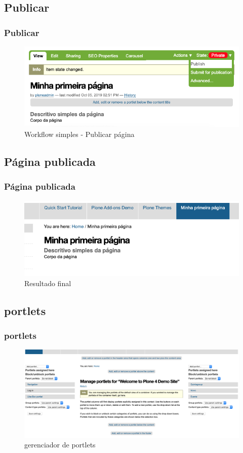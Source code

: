\documentclass{beamer}
\begin{document}
\subsection{Publicar}
\begin{frame}
    \frametitle{Publicar}
    \begin{figure}
        \includegraphics[width=.7\textwidth]{./img/001-004_-_publicar_pagina.png}
        \caption{Workflow simples - Publicar página}
    \end{figure}
\end{frame}

\subsection{Página publicada}
\begin{frame}
    \frametitle{Página publicada}
    \begin{figure}
        \includegraphics[width=.7\textwidth]{./img/001-005_-_pagina_publicada.png}
        \caption{Resultado final}
    \end{figure}
\end{frame}

\subsection{portlets}
\begin{frame}
    \frametitle{portlets}
    \begin{figure}
        \includegraphics[width=.7\textwidth]{./img/001-006_-_portlets.png}
        \caption{gerenciador de portlets}
    \end{figure}
\end{frame}
\end{document}
